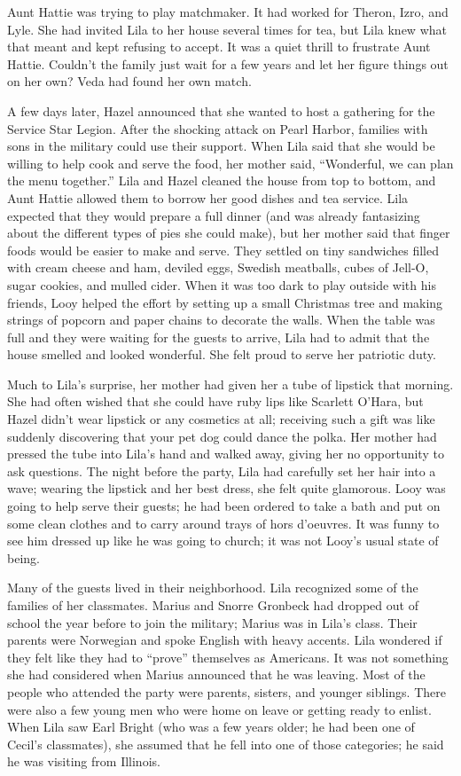 \documentclass[
  american,
  letterpaper,
]{book}
\begin{document}
Aunt Hattie was trying to play matchmaker. It had worked for Theron,
Izro, and Lyle. She had invited Lila to her house several times for tea,
but Lila knew what that meant and kept refusing to accept. It was a
quiet thrill to frustrate Aunt Hattie. Couldn't the family just wait for
a few years and let her figure things out on her own? Veda had found her
own match.

A few days later, Hazel announced that she wanted to host a gathering
for the Service Star Legion. After the shocking attack on Pearl Harbor,
families with sons in the military could use their support. When Lila
said that she would be willing to help cook and serve the food, her
mother said, ``Wonderful, we can plan the menu together.'' Lila and
Hazel cleaned the house from top to bottom, and Aunt Hattie allowed them
to borrow her good dishes and tea service. Lila expected that they would
prepare a full dinner (and was already fantasizing about the different
types of pies she could make), but her mother said that finger foods
would be easier to make and serve. They settled on tiny sandwiches
filled with cream cheese and ham, deviled eggs, Swedish meatballs, cubes
of Jell-O, sugar cookies, and mulled cider. When it was too dark to play
outside with his friends, Looy helped the effort by setting up a small
Christmas tree and making strings of popcorn and paper chains to
decorate the walls. When the table was full and they were waiting for
the guests to arrive, Lila had to admit that the house smelled and
looked wonderful. She felt proud to serve her patriotic duty.

Much to Lila's surprise, her mother had given her a tube of lipstick
that morning. She had often wished that she could have ruby lips like
Scarlett O'Hara, but Hazel didn't wear lipstick or any cosmetics at all;
receiving such a gift was like suddenly discovering that your pet dog
could dance the polka. Her mother had pressed the tube into Lila's hand
and walked away, giving her no opportunity to ask questions. The night
before the party, Lila had carefully set her hair into a wave; wearing
the lipstick and her best dress, she felt quite glamorous. Looy was
going to help serve their guests; he had been ordered to take a bath and
put on some clean clothes and to carry around trays of hors d'oeuvres.
It was funny to see him dressed up like he was going to church; it was
not Looy's usual state of being.

Many of the guests lived in their neighborhood. Lila recognized some of
the families of her classmates. Marius and Snorre Gronbeck had dropped
out of school the year before to join the military; Marius was in Lila's
class. Their parents were Norwegian and spoke English with heavy
accents. Lila wondered if they felt like they had to ``prove''
themselves as Americans. It was not something she had considered when
Marius announced that he was leaving. Most of the people who attended
the party were parents, sisters, and younger siblings. There were also a
few young men who were home on leave or getting ready to enlist. When
Lila saw Earl Bright (who was a few years older; he had been one of
Cecil's classmates), she assumed that he fell into one of those
categories; he said he was visiting from Illinois.
\end{document}
